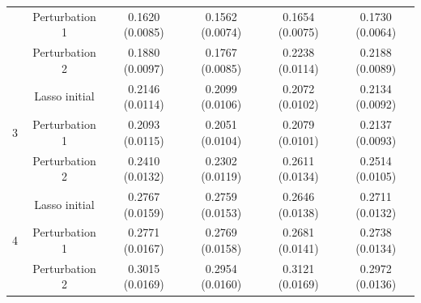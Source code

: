 \documentclass[12pt]{article}
\begin{document}
\begin{table}[!ht]
\begin{tabular}{cccccc}
        & Perturbation 1 & 0.1620 (0.0085) & 0.1562 (0.0074) & 0.1654 (0.0075) & 0.1730 (0.0064) \\
        & Perturbation 2  & 0.1880 (0.0097) & 0.1767 (0.0085) & 0.2238 (0.0114) & 0.2188 (0.0089) \\
        \hline
        \multirow{3}{*}{3} 
        & Lasso initial & 0.2146 (0.0114)& 0.2099 (0.0106)& 0.2072 (0.0102) &0.2134 (0.0092) \\ 
        & Perturbation 1   & 0.2093 (0.0115) & 0.2051 (0.0104) & 0.2079 (0.0101) & 0.2137 (0.0093)  \\
        & Perturbation 2  & 0.2410 (0.0132)  & 0.2302 (0.0119) & 0.2611 (0.0134) & 0.2514 (0.0105) \\
        \hline
        \multirow{3}{*}{4} 
        & Lasso initial & 0.2767 (0.0159) & 0.2759 (0.0153)&  0.2646 (0.0138) &0.2711 (0.0132) \\ 
        & Perturbation 1  & 0.2771 (0.0167) & 0.2769 (0.0158) & 0.2681 (0.0141)  & 0.2738 (0.0134) \\
        & Perturbation 2 & 0.3015 (0.0169) & 0.2954 (0.0160) & 0.3121 (0.0169)  & 0.2972 (0.0136)  \\
        \bottomrule
    \end{tabular}
\end{table}
\end{document}
